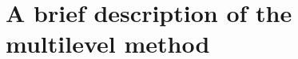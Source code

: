 \documentclass[runningheads]{llncs}
\begin{document}


\section{A brief description of the multilevel method}\label{des}
\end{document}
